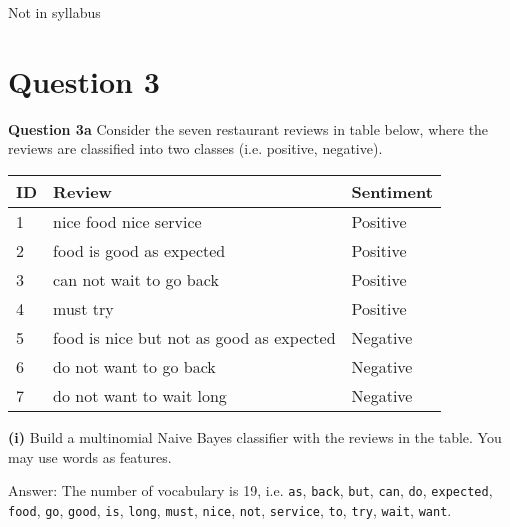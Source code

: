 \documentclass[11pt,a4paper]{report}
\begin{document}
\begin{multicols*}{2}
\noindent Not in syllabus

\section{Question 3}

\noindent \textbf{Question 3a} Consider the seven restaurant reviews in table below, where the reviews are classified into two classes (i.e. positive, negative).

\begin{center}
\begin{tabular}{| l | p{5cm} | l |}
    \hline
    ID  & Review & Sentiment \\ \hline
    1   & nice food nice service & Positive \\
    2   & food is good as expected & Positive \\
    3   & can not wait to go back & Positive \\
    4   & must try & Positive \\
    5   & food is nice but not as good as expected & Negative \\
    6   & do not want to go back & Negative \\
    7   & do not want to wait long & Negative \\
    \hline
\end{tabular}
\end{center}

\noindent \textbf{(i)} Build a multinomial Naive Bayes classifier with the reviews in the table. You may use words as features. 

\noindent Answer: The number of vocabulary is 19, i.e. \verb|as|, \verb|back|, \verb|but|, \verb|can|, \verb|do|, \verb|expected|, \verb|food|, \verb|go|, \verb|good|, \verb|is|, \verb|long|, \verb|must|, \verb|nice|, \verb|not|, \verb|service|, \verb|to|, \verb|try|, \verb|wait|, \verb|want|. 


\end{multicols*}
\end{document}
